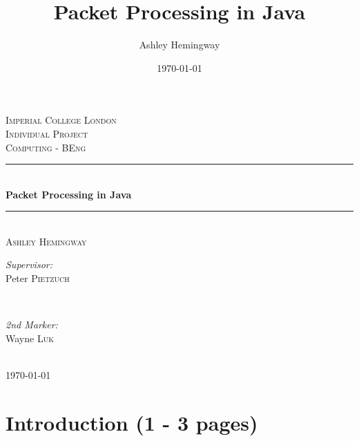\documentclass[a4paper, titlepage]{article}
\title{Packet Processing in Java}
\author{Ashley Hemingway}
\date{\monthyeardate\today}
\begin{document}
\begin{titlepage}

\newcommand{\HRule}{\rule{\linewidth}{0.5mm}}

\center

\textsc{\LARGE Imperial College London}\\[1.5cm]
\textsc{\Large Individual Project}\\[0.5cm]
\textsc{\large Computing - BEng}\\[0.5cm]

\HRule \\[0.4cm]
{ \huge \bfseries Packet Processing in Java}\\[0.4cm]
\HRule \\[1.5cm]

\textsc{\LARGE Ashley Hemingway}\\[1.5cm]

\begin{minipage}{0.4\textwidth}
\begin{flushleft} \large
\emph{Supervisor:}\\
Peter \textsc{Pietzuch}
\end{flushleft}
\end{minipage}
~
\begin{minipage}{0.4\textwidth}
\begin{flushright} \large
\emph{2nd Marker:} \\
Wayne \textsc{Luk}
\end{flushright}
\end{minipage}\\[4cm]

{\large \monthyeardate\today}\\[3cm]


\vfill

\end{titlepage}


\listoftodos

\newpage

\tableofcontents

\newpage

\section{Introduction (1 - 3 pages)}
\end{document}

